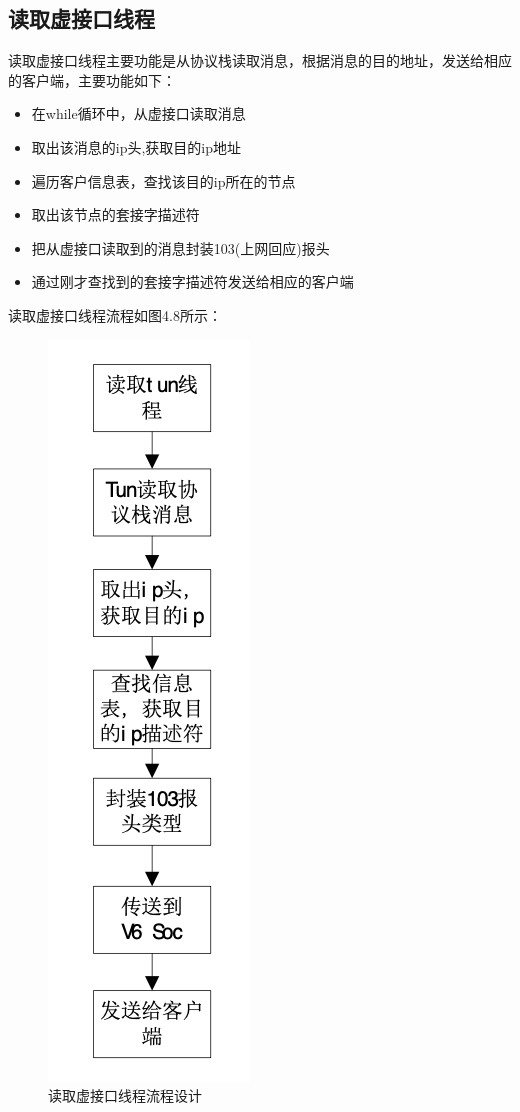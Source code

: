 \subsection{读取虚接口线程}

读取虚接口线程主要功能是从协议栈读取消息，根据消息的目的地址，发送给相应的客户端，主要功能如下：
\begin{itemize}
  \item 在while循环中，从虚接口读取消息
  \item 取出该消息的ip头,获取目的ip地址
  \item 遍历客户信息表，查找该目的ip所在的节点
  \item 取出该节点的套接字描述符
  \item 把从虚接口读取到的消息封装103(上网回应)报头
  \item 通过刚才查找到的套接字描述符发送给相应的客户端
\end{itemize}

读取虚接口线程流程如图4.8所示：
\begin{figure}[!ht]
	\begin{center}
	\includegraphics[scale=.58]{server_virtual.png}
	\end{center}
	\caption{读取虚接口线程流程设计}
	\label{figure:读取虚接口线程流程设计}
\end{figure}

